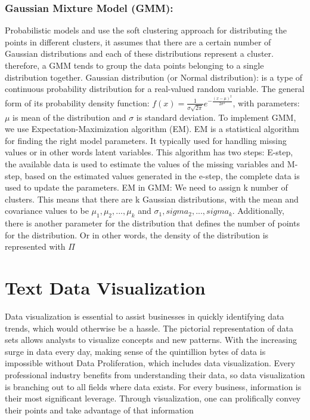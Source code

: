 \documentclass[a4paper,12pt]{report}
\begin{document}
    \subsubsection{Gaussian Mixture Model (GMM): }
    Probabilistic models and use the soft clustering approach for distributing the points in different clusters, it assumes that there are a certain number of Gaussian distributions and each of these distributions represent a cluster. therefore, a GMM tends to group the data points belonging to a single distribution together.
    \newline\newline
    Gaussian distribution (or Normal distribution)\cite{GMM}: is a type of continuous probability distribution for a real-valued random variable. The general form of its probability density function:
    $f(x) = \frac{1}{\sigma \sqrt{2\pi}}e^{-\frac{(x-\mu)^2}{2\sigma^2}}$, with parameters: $\mu$ is mean of the distribution and $\sigma$ is standard deviation.
    \newline\newline
    To implement GMM, we use Expectation-Maximization algorithm (EM)\cite{GMM}. EM is a statistical algorithm for finding the right model parameters.
    It typically used for handling missing values or in other words latent variables. This algorithm has two steps: E-step, the available data is used to estimate the values of the missing variables
    and M-step, based on the estimated values generated in the e-step, the complete data is used to update the parameters.
    \newline\newline
    EM in GMM\cite{GMM}: We need to assign k number of clusters. This means that there are k Gaussian distributions, with the mean and covariance values to be $\mu_1, \mu_2, ..., \mu_k$
    and $\sigma_1, sigma_2, ..., sigma_k$. Additionally, there is another parameter for the distribution that defines the number of points for the distribution. Or in other words, the density of the distribution is represented with $\Pi$


    \section{Text Data Visualization}
    Data visualization is essential to assist businesses in quickly identifying data trends, which would otherwise be a hassle. The pictorial representation of data sets allows analysts to visualize concepts and new patterns. With the increasing surge in data every day, making sense of the quintillion bytes of data is impossible without Data Proliferation, which includes data visualization.
    \newline\newline
    Every professional industry benefits from understanding their data, so data visualization \cite{DataVizImportance} is branching out to all fields where data exists. For every business, information is their most significant leverage. Through visualization, one can prolifically convey their points and take advantage of that information
    
\end{document}
